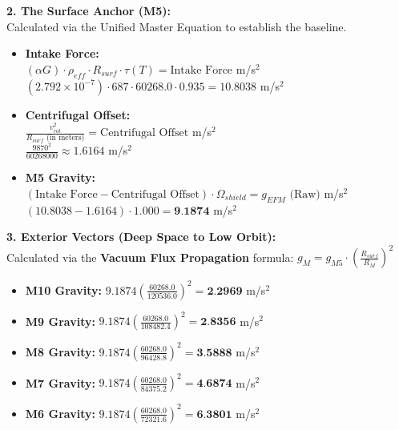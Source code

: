 \documentclass[11pt, a4paper]{article}
\begin{document}
  \vspace{1.0em}
  \noindent \textbf{2. The Surface Anchor (M5):} \\
  \hspace*{1em} Calculated via the Unified Master Equation to establish the baseline.
  \begin{itemize}
    \item \textbf{Intake Force:} \\[0.5em]
    \hspace*{2em} $(\alpha G) \cdot \rho_{eff} \cdot R_{surf} \cdot \tau(T) = \text{Intake Force}$ m/s$^2$ \\[1em]
    \hspace*{2em} $(2.792 \times 10^{-7}) \cdot 687 \cdot 60268.0 \cdot 0.935 = 10.8038$ m/s$^2$
    
    \item \textbf{Centrifugal Offset:} \\[0.5em]
    \hspace*{2em} $\frac{v_{rot}^2}{R_{surf} \text{ (in meters)}} = \text{Centrifugal Offset}$ m/s$^2$ \\[1em]
    \hspace*{2em} $\frac{9870^2}{60268000} \approx 1.6164$ m/s$^2$
    
    \item \textbf{M5 Gravity:} \\[0.5em]
    \hspace*{2em} $(\text{Intake Force} - \text{Centrifugal Offset}) \cdot \Omega_{shield} = g_{EFM} \text{ (Raw)}$ m/s$^2$ \\[1em]
    \hspace*{2em} $(10.8038 - 1.6164) \cdot 1.000 = \textbf{9.1874}$ m/s$^2$
  \end{itemize}

  \clearpage
  \noindent \textbf{3. Exterior Vectors (Deep Space to Low Orbit):} \\
  \hspace*{1em} Calculated via the \textbf{Vacuum Flux Propagation} formula: $g_M = g_{M5} \cdot \left( \frac{R_{surf}}{R_M} \right)^2$
  \begin{itemize}
    \item \textbf{M10 Gravity:} $9.1874 \left( \frac{60268.0}{120536.0} \right)^2 = \textbf{2.2969}$ m/s$^2$
    \item \textbf{M9 Gravity:} $9.1874 \left( \frac{60268.0}{108482.4} \right)^2 = \textbf{2.8356}$ m/s$^2$
    \item \textbf{M8 Gravity:} $9.1874 \left( \frac{60268.0}{96428.8} \right)^2 = \textbf{3.5888}$ m/s$^2$
    \item \textbf{M7 Gravity:} $9.1874 \left( \frac{60268.0}{84375.2} \right)^2 = \textbf{4.6874}$ m/s$^2$
    \item \textbf{M6 Gravity:} $9.1874 \left( \frac{60268.0}{72321.6} \right)^2 = \textbf{6.3801}$ m/s$^2$
  \end{itemize}
\end{document}
